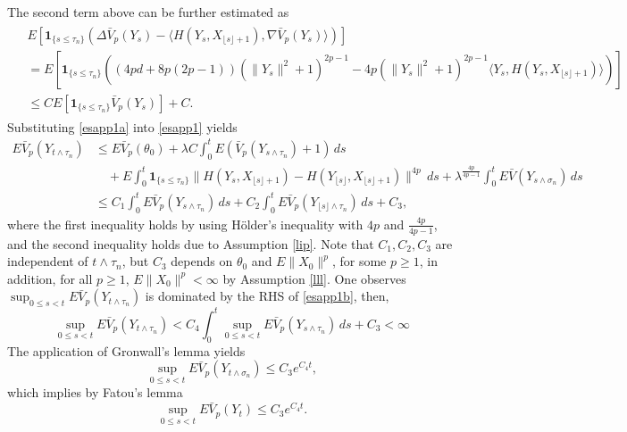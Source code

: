 \documentclass[a4paper]{article}
\begin{document}
The second term above can be further estimated as
\begin{align}
\begin{split}\label{esapp1a}
&E \left[\mathbf{1}_{\{s \leq \tau_n\}} \left(\Delta \bar{V}_p(Y_s)- \langle H(Y_s, X_{\lfloor s \rfloor+1}), \nabla \bar{V}_p(Y_s)\rangle \right)\right] \\
& =E \left[\mathbf{1}_{\{s \leq \tau_n\}}\left((4pd+8p(2p-1))(\|Y_s\|^2+1)^{2p-1}-4p(\|Y_s\|^2+1)^{2p-1} \langle Y_s, H(Y_s, X_{\lfloor s \rfloor+1}) \rangle\right) \right]\\
& \leq CE \left[\mathbf{1}_{\{s \leq \tau_n\}} \bar{V}_p(Y_s) \right] +C.
\end{split}
\end{align}
Substituting \eqref{esapp1a} into \eqref{esapp1} yields
\begin{align}\label{esapp1b}
E\bar{V}_p(Y_{t\wedge \tau_n})			&\leq E\bar{V}_p(\theta_0) +\lambda C \int_0^t E ( \bar{V}_p(Y_{s\wedge \tau_n})+ 1)\,ds  \nonumber\\
									&\hspace{1em}+E\int_0^t  \mathbf{1}_{\{s \leq \tau_n\}} \| H(Y_s,  X_{\lfloor s \rfloor+1}) - H(Y_ {\lfloor s \rfloor}, X_{\lfloor s \rfloor+1})\|^{4p}\,ds + \lambda^{\frac{4p}{4p-1}}\int_0^tE\bar{V}(Y_{s\wedge \sigma_n})\,ds  \nonumber\\
									& \leq C_1 \int_0^t E\bar{V}_p(Y_{s \wedge \tau_n})\, ds+C_2\int_0^t E\bar{V}_p(Y_{\lfloor s\rfloor \wedge \tau_n})\, ds+C_3,
\end{align}
where the first inequality holds by using H\"{o}lder's inequality with $4p$ and $\frac{4p}{4p-1}$, and the second inequality holds due to Assumption \ref{lip}. Note that $C_1, C_2, C_3$ are independent of $t \wedge \tau_n$, but $C_3$ depends on $\theta_0$ and $E\|X_0\|^p$, for some $p \geq 1$, in addition,   for all $p\geq 1$, $E\|X_0\|^p< \infty$ by Assumption \ref{lll}. One observes $\sup_{0\leq s <t} E\bar{V}_p(Y_{t\wedge \tau_n}) $ is dominated by the RHS of \eqref{esapp1b}, then,
\[
\sup_{0 \leq s <t}E\bar{V}_p(Y_{t\wedge \tau_n}) < C_4 \int_0^t \sup_{0 \leq s <t}E\bar{V}_p(Y_{s \wedge \tau_n})\, ds +C_3 <\infty
\] 
The application of Gronwall's lemma yields
\[
\sup_{0 \leq s <t}E\bar{V}_p(Y_{t \wedge \sigma_n})  \leq C_3 e^{C_4t},
\]
which implies by Fatou's lemma
\[
\sup_{0 \leq s <t}E\bar{V}_p(Y_t) \leq C_3 e^{C_4t}.
\]
\end{document}
